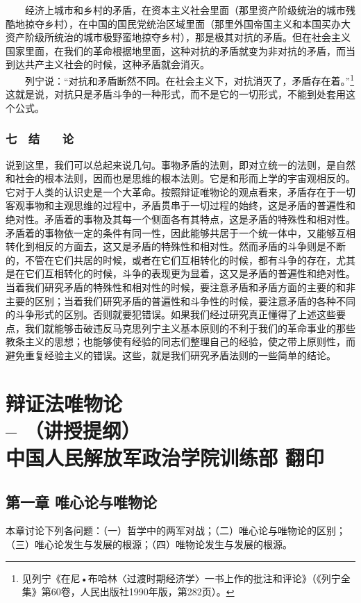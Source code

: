 \documentclass[cn,11pt,chinese]{elegantbook}
\def\myformat#1{\hfil\hfil #1}
\begin{document}
　　经济上城市和乡村的矛盾，在资本主义社会里面（那里资产阶级统治的城市残酷地掠夺乡村），在中国的国民党统治区域里面（那里外国帝国主义和本国买办大资产阶级所统治的城市极野蛮地掠夺乡村），那是极其对抗的矛盾。但在社会主义国家里面，在我们的革命根据地里面，这种对抗的矛盾就变为非对抗的矛盾，而当到达共产主义社会的时候，这种矛盾就会消灭。\\
　　列宁说：“对抗和矛盾断然不同。在社会主义下，对抗消灭了，矛盾存在着。”\footnote[37]{ 见列宁《在尼•布哈林〈过渡时期经济学〉一书上作的批注和评论》（《列宁全集》第60卷，人民出版社1990年版，第282页）。}这就是说，对抗只是矛盾斗争的一种形式，而不是它的一切形式，不能到处套用这个公式。\\
\subsection*{\myformat{七　结　　论}}
说到这里，我们可以总起来说几句。事物矛盾的法则，即对立统一的法则，是自然和社会的根本法则，因而也是思维的根本法则。它是和形而上学的宇宙观相反的。它对于人类的认识史是一个大革命。按照辩证唯物论的观点看来，矛盾存在于一切客观事物和主观思维的过程中，矛盾贯串于一切过程的始终，这是矛盾的普遍性和绝对性。矛盾着的事物及其每一个侧面各有其特点，这是矛盾的特殊性和相对性。矛盾着的事物依一定的条件有同一性，因此能够共居于一个统一体中，又能够互相转化到相反的方面去，这又是矛盾的特殊性和相对性。然而矛盾的斗争则是不断的，不管在它们共居的时候，或者在它们互相转化的时候，都有斗争的存在，尤其是在它们互相转化的时候，斗争的表现更为显着，这又是矛盾的普遍性和绝对性。当着我们研究矛盾的特殊性和相对性的时候，要注意矛盾和矛盾方面的主要的和非主要的区别；当着我们研究矛盾的普遍性和斗争性的时候，要注意矛盾的各种不同的斗争形式的区别。否则就要犯错误。如果我们经过研究真正懂得了上述这些要点，我们就能够击破违反马克思列宁主义基本原则的不利于我们的革命事业的那些教条主义的思想；也能够使有经验的同志们整理自己的经验，使之带上原则性，而避免重复经验主义的错误。这些，就是我们研究矛盾法则的一些简单的结论。\\
\newpage


\chapter*{辩证法唯物论 \\ -- （讲授提纲）\\ 中国人民解放军政治学院训练部 翻印}\newpage\section*{\myformat{第一章  唯心论与唯物论}}
本章讨论下列各问题：（一）哲学中的两军对战；（二）唯心论与唯物论的区别；（三）唯心论发生与发展的根源；（四）唯物论发生与发展的根源。\\
\end{document}
